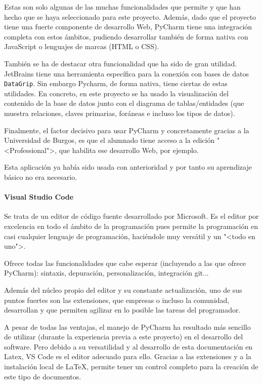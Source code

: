 Estas son solo algunas de las muchas funcionalidades que permite y que han hecho
que se haya seleccionado para este proyecto. Además, dado que el proyecto tiene
una fuerte componente de desarrollo Web, PyCharm tiene una integración completa
con estos ámbitos, pudiendo desarrollar también de forma nativa con JavaScript o
lenguajes de marcas (HTML o CSS).

También se ha de destacar otra funcionalidad que ha sido de gran utilidad.
JetBrains tiene una herramienta específica para la conexión con bases de datos
\texttt{DataGrip}. Sin embargo Pycharm, de forma nativa, tiene ciertas de estas
utilidades. En concreto, en este proyecto se ha usado la visualización del
contenido de la base de datos junto con el diagrama de tablas/entidades (que
muestra relaciones, claves primarias, foráneas e incluso los tipos de datos).

Finalmente, el factor decisivo para usar PyCharm y concretamente gracias a la
Universidad de Burgos, es que el alumnado tiene acceso a la edición
"<Professional">, que habilita ese desarrollo Web, por ejemplo.

Esta aplicación ya había sido usada con anterioridad y por tanto su aprendizaje
básico no era necesario.

\paragraph{Visual Studio Code}
Se trata de un editor de código fuente desarrollado por Microsoft. Es el editor
por excelencia en todo el ámbito de la programación pues permite la programación
en casi cualquier lenguaje de programación, haciéndole muy versátil y un "<todo
en uno">.

Ofrece todas las funcionalidades que cabe esperar (incluyendo a las que ofrece
PyCharm): sintaxis, depuración, personalización, integración git...

Además del núcleo propio del editor y su constante actualización, uno de sus
puntos fuertes son las extensiones, que empresas o incluso la comunidad,
desarrollan y que permiten agilizar en lo posible las tareas del programador.

A pesar de todas las ventajas, el manejo de PyCharm ha resultado más sencillo de
utilizar (durante la experiencia previa a este proyecto) en el desarrollo del
software. Pero debido a su versatilidad y al desarrollo de esta documentación en
Latex, VS Code es el editor adecuado para ello. Gracias a las extensiones y a la
instalación local de \LaTeX, permite tener un control completo para la creación
de este tipo de documentos.

